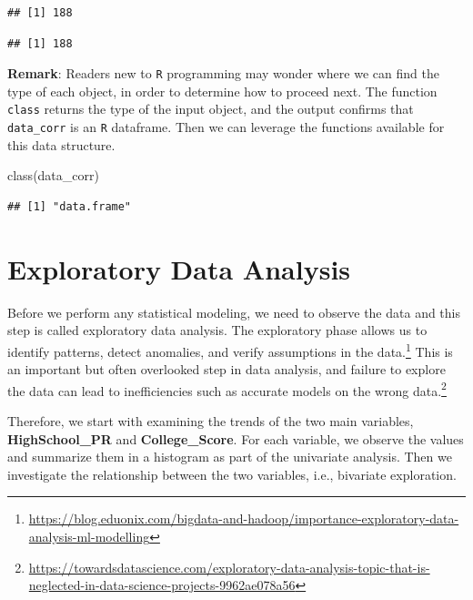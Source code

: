 \documentclass[
]{article}
\newenvironment{Shaded}{\begin{snugshade}}{\end{snugshade}}
\newcommand{\FunctionTok}[1]{\textcolor[rgb]{0.00,0.00,0.00}{#1}}
\newcommand{\NormalTok}[1]{#1}
\newcommand{\SpecialCharTok}[1]{\textcolor[rgb]{0.00,0.00,0.00}{#1}}
\begin{document}
\begin{verbatim}
## [1] 188
\end{verbatim}

\begin{Shaded}
\end{Shaded}

\begin{verbatim}
## [1] 188
\end{verbatim}

\textbf{Remark}: Readers new to \texttt{R} programming may wonder where
we can find the type of each object, in order to determine how to
proceed next. The function \texttt{class} returns the type of the input
object, and the output confirms that \texttt{data\_corr} is an
\texttt{R} dataframe. Then we can leverage the functions available for
this data structure.

\begin{Shaded}
\begin{Highlighting}[]
\FunctionTok{class}\NormalTok{(data\_corr)}
\end{Highlighting}
\end{Shaded}

\begin{verbatim}
## [1] "data.frame"
\end{verbatim}

\hypertarget{eda}{%
\section{Exploratory Data Analysis}\label{eda}}

Before we perform any statistical modeling, we need to observe the data
and this step is called exploratory data analysis. The exploratory phase
allows us to identify patterns, detect anomalies, and verify assumptions
in the data.\footnote{\url{https://blog.eduonix.com/bigdata-and-hadoop/importance-exploratory-data-analysis-ml-modelling}}
This is an important but often overlooked step in data analysis, and
failure to explore the data can lead to inefficiencies such as accurate
models on the wrong data.\footnote{\url{https://towardsdatascience.com/exploratory-data-analysis-topic-that-is-neglected-in-data-science-projects-9962ae078a56}}

Therefore, we start with examining the trends of the two main variables,
\textbf{HighSchool\_PR} and \textbf{College\_Score}. For each variable,
we observe the values and summarize them in a histogram as part of the
univariate analysis. Then we investigate the relationship between the
two variables, i.e., bivariate exploration.
\end{document}
